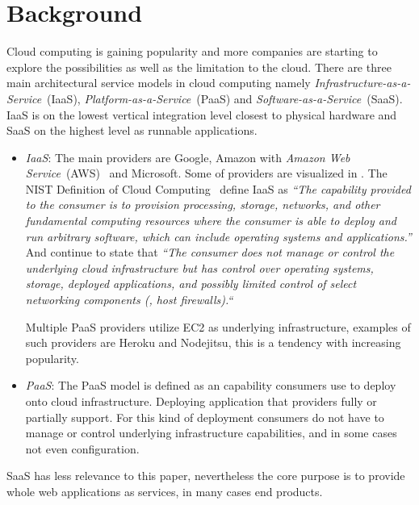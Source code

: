 \chapter{Background}




Cloud computing is gaining popularity and more companies are starting 
to explore the possibilities as well as the limitation to the cloud.
There are three main architectural service models in cloud computing\cite{introduction:wozniak10}
namely \emph{Infrastructure-as-a-Service}~(IaaS), \emph{Platform-as-a-Service}~(PaaS)
and \emph{Software-as-a-Service}~(SaaS).
IaaS is on the lowest vertical integration level closest to physical hardware and SaaS on the highest
level as runnable applications.
\begin{itemize}
  \item \emph{IaaS}: 
    The main providers are Google, Amazon with \emph{Amazon Web Service}~(AWS)~\cite{aws} and Microsoft.
    Some of providers are visualized in .
    The NIST Definition of Cloud Computing~\cite{nist:mell11} define IaaS as
    \emph{``The capability provided to the consumer is to provision 
    processing, storage, networks, and other fundamental computing resources where the 
    consumer is able to deploy and run arbitrary software, which can include operating 
    systems and applications.''}
    And continue to state that \emph{``The consumer does not manage or control the underlying cloud 
    infrastructure but has control over operating systems, storage, deployed applications, and 
    possibly limited control of select networking components (\eg, host firewalls).``}


    Multiple PaaS providers utilize EC2 as underlying infrastructure, examples of such
    providers are Heroku and Nodejitsu, this is a tendency with increasing popularity.
  \item \emph{PaaS}:
    The PaaS model is defined as an capability consumers use to deploy onto cloud infrastructure.
    Deploying application that providers fully or partially support. For this kind of deployment
    consumers do not have to manage or control underlying infrastructure capabilities,
    and in some cases not even configuration.
\end{itemize}
SaaS has less relevance to this paper, nevertheless the core purpose
is to provide whole web applications as services, in many cases end products.

